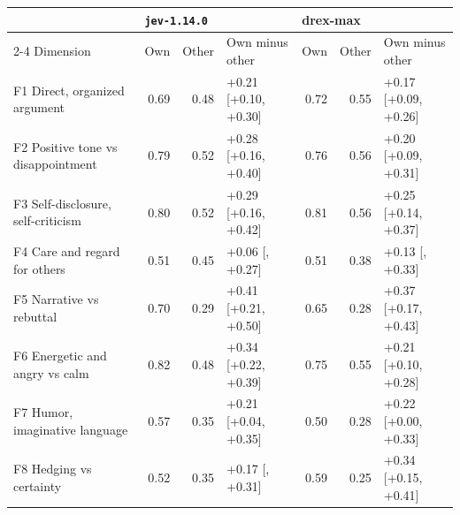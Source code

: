 {\scriptsize
\begin{tabular}{@{}l rrl rrl@{}}
\toprule
 & \multicolumn{3}{l}{\texttt{jev-1.14.0}} & \multicolumn{3}{l}{drex-max} \\
\cmidrule(r){2-4}\cmidrule{5-7}
Dimension & Own & Other & Own minus other & Own & Other & Own minus other \\
\midrule
F1 Direct, organized argument & 0.69 & 0.48 & +0.21 {\scriptsize[+0.10, +0.30]} & 0.72 & 0.55 & +0.17 {\scriptsize[+0.09, +0.26]} \\
F2 Positive tone vs disappointment & 0.79 & 0.52 & +0.28 {\scriptsize[+0.16, +0.40]} & 0.76 & 0.56 & +0.20 {\scriptsize[+0.09, +0.31]} \\
F3 Self-disclosure, self-criticism & 0.80 & 0.52 & +0.29 {\scriptsize[+0.16, +0.42]} & 0.81 & 0.56 & +0.25 {\scriptsize[+0.14, +0.37]} \\
F4 Care and regard for others & 0.51 & 0.45 & +0.06 {\scriptsize[\textminus 0.22, +0.27]} & 0.51 & 0.38 & +0.13 {\scriptsize[\textminus 0.15, +0.33]} \\
F5 Narrative vs rebuttal & 0.70 & 0.29 & +0.41 {\scriptsize[+0.21, +0.50]} & 0.65 & 0.28 & +0.37 {\scriptsize[+0.17, +0.43]} \\
F6 Energetic and angry vs calm & 0.82 & 0.48 & +0.34 {\scriptsize[+0.22, +0.39]} & 0.75 & 0.55 & +0.21 {\scriptsize[+0.10, +0.28]} \\
F7 Humor, imaginative language & 0.57 & 0.35 & +0.21 {\scriptsize[+0.04, +0.35]} & 0.50 & 0.28 & +0.22 {\scriptsize[+0.00, +0.33]} \\
F8 Hedging vs certainty & 0.52 & 0.35 & +0.17 {\scriptsize[\textminus 0.02, +0.31]} & 0.59 & 0.25 & +0.34 {\scriptsize[+0.15, +0.41]} \\
\bottomrule
\end{tabular}}
